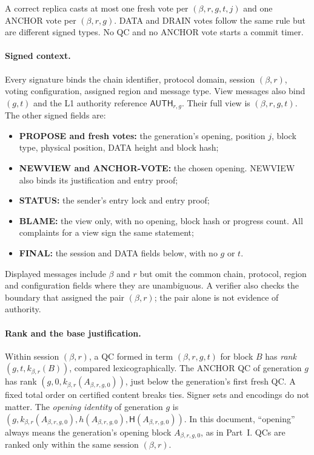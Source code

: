 \documentclass[11pt,a4paper]{article}
\newcommand{\Hash}{\mathsf H}
\newcommand{\tagg}[1]{\ensuremath{\mathsf{#1}}}
\newcommand{\defterm}[1]{\textcolor{rrBlue}{\textit{#1}}}
\newcounter{protocol}
\begin{document}
A correct replica casts at most one fresh vote per $(\beta,r,g,t,j)$ and one
ANCHOR vote per $(\beta,r,g)$. DATA and DRAIN votes follow the same rule but
are different signed types. No QC and no ANCHOR vote starts a commit
timer.

\paragraph{Signed context.}
Every signature binds the chain identifier, protocol domain, session
$(\beta,r)$, voting configuration, assigned region and message type.
View messages also bind $(g,t)$ and the L1 authority reference
$\tagg{AUTH}_{r,g}$. Their full view is $(\beta,r,g,t)$.
The other signed fields are:
\begin{itemize}
\item \textbf{PROPOSE and fresh votes:} the generation's opening,
position $j$, block type, physical position, DATA height and block hash;
\item \textbf{NEWVIEW and ANCHOR-VOTE:} the chosen opening. NEWVIEW
also binds its justification and entry proof;
\item \textbf{STATUS:} the sender's entry lock and entry proof;
\item \textbf{BLAME:} the view only, with no opening, block hash or
progress count. All complaints for a view sign the same statement;
\item \textbf{FINAL:} the session and DATA fields below, with no $g$ or $t$.
\end{itemize}
Displayed messages include $\beta$ and $r$ but omit the common chain,
protocol, region and configuration fields where they are unambiguous.
A verifier also checks the boundary that assigned the pair $(\beta,r)$;
the pair alone is not evidence of authority.

\paragraph{Rank and the base justification.}
Within session $(\beta,r)$, a QC formed in term $(\beta,r,g,t)$ for block $B$ has \defterm{rank}
$(g,t,k_{\beta,r}(B))$, compared lexicographically. The ANCHOR QC of generation
$g$ has rank $(g,0,k_{\beta,r}(A_{\beta,r,g,0}))$, just below the generation's first
fresh QC. A fixed total order on certified content breaks ties. Signer
sets and encodings do not matter. The \defterm{opening
identity} of generation $g$ is
$(g,k_{\beta,r}(A_{\beta,r,g,0}),h(A_{\beta,r,g,0}),\Hash(A_{\beta,r,g,0}))$. In this document,
``opening'' always means the generation's opening block $A_{\beta,r,g,0}$, as
in Part~I. QCs are ranked only within the same session $(\beta,r)$.
\end{document}
